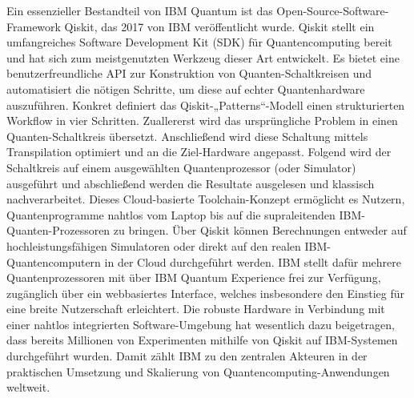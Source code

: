 Ein essenzieller Bestandteil von IBM Quantum ist das Open-Source-Software-Framework Qiskit, das 2017 von IBM veröffentlicht wurde. Qiskit stellt ein umfangreiches Software Development Kit (SDK) für Quantencomputing bereit und hat sich zum meistgenutzten Werkzeug dieser Art entwickelt. Es bietet eine benutzerfreundliche API zur Konstruktion von Quanten-Schaltkreisen und automatisiert die nötigen Schritte, um diese auf echter Quantenhardware auszuführen. Konkret definiert das Qiskit-„Patterns“-Modell einen strukturierten Workflow in vier Schritten. Zuallererst wird das ursprüngliche Problem in einen Quanten-Schaltkreis übersetzt. Anschließend wird diese Schaltung mittels Transpilation optimiert und an die Ziel-Hardware angepasst. Folgend wird der Schaltkreis auf einem ausgewählten Quantenprozessor (oder Simulator) ausgeführt und abschließend werden die Resultate ausgelesen und klassisch nachverarbeitet. \citealp[7]{abughanemIBMQuantumComputers2025} Dieses Cloud-basierte Toolchain-Konzept ermöglicht es Nutzern, Quantenprogramme nahtlos vom Laptop bis auf die supraleitenden IBM-Quanten-Prozessoren zu bringen. Über Qiskit können Berechnungen entweder auf hochleistungsfähigen Simulatoren oder direkt auf den realen IBM-Quantencomputern in der Cloud durchgeführt werden. IBM stellt dafür mehrere Quantenprozessoren mit über IBM Quantum Experience frei zur Verfügung, zugänglich über ein webbasiertes Interface, welches insbesondere den Einstieg für eine breite Nutzerschaft erleichtert. \citealp[5]{wangAdvantagesTwoQuantum2025} Die robuste Hardware in Verbindung mit einer nahtlos integrierten Software-Umgebung hat wesentlich dazu beigetragen, dass bereits Millionen von Experimenten mithilfe von Qiskit auf IBM-Systemen durchgeführt wurden. Damit zählt IBM zu den zentralen Akteuren in der praktischen Umsetzung und Skalierung von Quantencomputing-Anwendungen weltweit.

